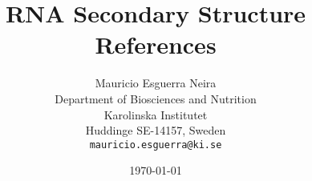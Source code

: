 \documentclass[11pt, twoside, pdftex]{article}
\title{RNA Secondary Structure References}
\author{Mauricio Esguerra Neira\\
\small  Department of Biosciences and Nutrition\\[-0.8ex]
\small  Karolinska Institutet\\[-0.8ex]
\small Huddinge SE-14157, Sweden\\[-0.8ex]
\small  \texttt{mauricio.esguerra@ki.se}}
\date{\today}
\begin{document}
\maketitle


\begin{refsection}
\nocite{tinoco1971, tinoco1973, nussinov1978}
\printbibliography[title=Classics,section=1]
\end{refsection}

\begin{refsection}
\nocite{eddy2004}
\printbibliography[title=Reviews,section=2]
\end{refsection}

\begin{refsection}
\nocite{harmanci2007}
\printbibliography[title=Software,section=3]
\end{refsection}

\begin{refsection}
\nocite{avihoo2011}
\printbibliography[title=Inverse Folding,section=4]
\end{refsection}

\begin{refsection}
\nocite{baker2011}
\printbibliography[title=lncRNA,section=5]
\end{refsection}
\end{document}

